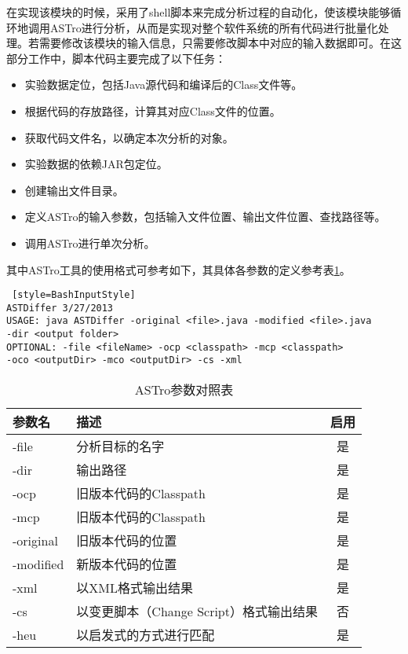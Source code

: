 在实现该模块的时候，采用了shell脚本来完成分析过程的自动化，使该模块能够循环地调用ASTro进行分析，从而是实现对整个软件系统的所有代码进行批量化处理。若需要修改该模块的输入信息，只需要修改脚本中对应的输入数据即可。在这部分工作中，脚本代码主要完成了以下任务：

\begin{itemize}
	\item 实验数据定位，包括Java源代码和编译后的Class文件等。
	\item 根据代码的存放路径，计算其对应Class文件的位置。
	\item 获取代码文件名，以确定本次分析的对象。
	\item 实验数据的依赖JAR包定位。
	\item 创建输出文件目录。
	\item 定义ASTro的输入参数，包括输入文件位置、输出文件位置、查找路径等。
	\item 调用ASTro进行单次分析。
\end{itemize}

其中ASTro工具的使用格式可参考如下，其具体各参数的定义参考表\ref {ASTro}。

\begin{lstlisting} [style=BashInputStyle]
ASTDiffer 3/27/2013
USAGE: java ASTDiffer -original <file>.java -modified <file>.java 
-dir <output folder>
OPTIONAL: -file <fileName> -ocp <classpath> -mcp <classpath> 
-oco <outputDir> -mco <outputDir> -cs -xml
\end{lstlisting}	

\begin{table}
	\caption{ASTro参数对照表}
	\label{ASTro}
	\centering
	\begin{tabular}{llc}
		\toprule[1.5pt] 
		{\heiti 参数名} & {\heiti 描述} & {\heiti 启用}\\\midrule[1pt]
		-file & 分析目标的名字 & 是 \\
		-dir & 输出路径 & 是 \\
		-ocp & 旧版本代码的Classpath & 是\\
		-mcp & 旧版本代码的Classpath & 是\\
		-original    & 旧版本代码的位置 & 是\\
		-modified   & 新版本代码的位置 & 是\\
		-xml   & 以XML格式输出结果 & 是\\
		-cs   & 以变更脚本（Change Script）格式输出结果 & 否\\
		-heu   & 以启发式的方式进行匹配 & 是\\
		\bottomrule[1.5pt]
	\end{tabular}	
\end{table}

